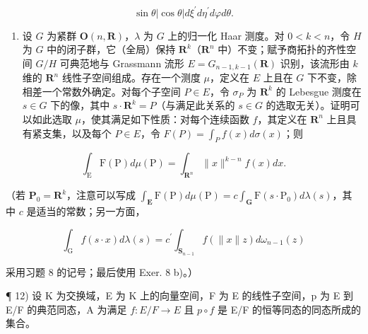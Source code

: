 \[
\sin \theta | \cos \theta | d \xi^ {\prime} d \eta^ {\prime} d \varphi d \theta .
\]

\begin{enumerate}
\def\labelenumi{\arabic{enumi})}
\setcounter{enumi}{10}
\tightlist
\item
  设 \(G\) 为紧群 \(\mathbf{O}(n, \mathbf{R})\)，\(\lambda\) 为 \(G\) 上的归一化 Haar 测度。对 \(0 < k < n\)，令 \(H\) 为 \(G\) 中的闭子群，它（全局）保持 \(\mathbf{R}^k\)（\(\mathbf{R}^n\) 中）不变；赋予商拓扑的齐性空间 \(G / H\) 可典范地与 Grassmann 流形 \(E = G_{n-1, k-1}(\mathbf{R})\) 识别，该流形由 \(k\) 维的 \(\mathbf{R}^n\) 线性子空间组成。存在一个测度 \(\mu\)，定义在 \(E\) 上且在 \(G\) 下不变，除相差一个常数外确定。对每个子空间 \(P \in E\)，令 \(\sigma_P\) 为 \(\mathbf{R}^k\) 的 Lebesgue 测度在 \(s \in G\) 下的像，其中 \(s \cdot \mathbf{R}^k = P\)（与满足此关系的 \(s \in G\) 的选取无关）。证明可以如此选取 \(\mu\)，使其满足如下性质：对每个连续函数 \(f\)，其定义在 \(\mathbf{R}^n\) 上且具有紧支集，以及每个 \(P \in E\)，令 \(F(P) = \int_{P} f(x) d\sigma(x)\)；则
\end{enumerate}

\[
\int_ {\mathrm{E}} \mathrm{F} (\mathrm{P}) d \mu (\mathrm{P}) = \int_ {\mathbf {R} ^ {n}} \| x \| ^ {k - n} f (x) d x.
\]

（若 \(\mathbf{P}_0 = \mathbf{R}^k\)，注意可以写成 \(\int_{\mathbf{E}} \mathrm{F}(\mathrm{P}) d\mu(\mathrm{P}) = c \int_{\mathbf{G}} \mathrm{F}(s \cdot \mathrm{P}_0) d\lambda(s)\)，其中 \(c\) 是适当的常数；另一方面，

\[
\int_ {\mathrm{G}} f (s \cdot x) d \lambda (s) = c ^ {\prime} \int_ {\mathbf {S} _ {n - 1}} f (\| x \| z) d \omega_ {n - 1} (z)
\]

采用习题 8 的记号；最后使用 Exer. 8 b)。）

¶ 12) 设 K 为交换域，E 为 K 上的向量空间，F 为 E 的线性子空间，p 为 E 到 E/F 的典范同态，A 为满足 \(f: E/F \to E\) 且 \(p \circ f\) 是 E/F 的恒等同态的同态所成的集合。

